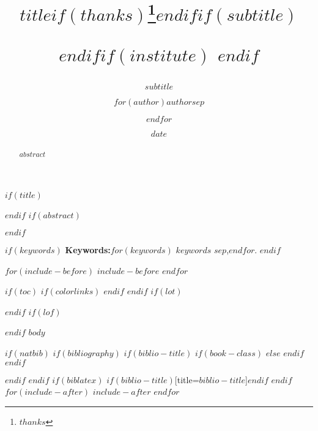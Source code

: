 \documentclass[$if(fontsize)$$fontsize$,$endif$$if(lang)$$babel-lang$,$endif$$if(papersize)$$papersize$paper,$endif$$for(classoption)$$classoption$$sep$,$endfor$]{$documentclass$}
\title{$title$$if(thanks)$\thanks{$thanks$}$endif$$if(subtitle)$%
		\subtitle{$subtitle$}$endif$$if(institute)$\institute{$institute$}%
		$endif$}
\author{$for(author)$$author$$sep$ \and $endfor$}
\institute{$for(institute)$$institute$$sep$ \and $endfor$}
\date{$date$}
\begin{document}
	$if(title)$
		\maketitle
	$endif$
	$if(abstract)$
		\begin{abstract}
			$abstract$
		\end{abstract}
	$endif$

	$if(keywords)$
		{\bfseries Keywords:}$for(keywords)$ $keywords$ $sep$,$endfor$.
	$endif$

	$for(include-before)$
		$include-before$
	$endfor$

	$if(toc)${
		$if(colorlinks)$
			\hypersetup{linkcolor=$if(toccolor)$$toccolor$$else$black$endif$}
		$endif$
		\setcounter{tocdepth}{$toc-depth$}
		\tableofcontents
	}
	$endif$
	$if(lot)$
		\listoftables
	$endif$
	$if(lof)$
		\listoffigures
	$endif$
	$body$

	$if(natbib)$
	$if(bibliography)$
	$if(biblio-title)$
	$if(book-class)$
		\renewcommand\bibname{$biblio-title$}
	$else$
		\renewcommand\refname{$biblio-title$}
	$endif$
	$endif$
	

	$endif$
	$endif$
	$if(biblatex)$
		\printbibliography$if(biblio-title)$[title=$biblio-title$]$endif$
	$endif$
	$for(include-after)$
		$include-after$
	$endfor$
\end{document}
